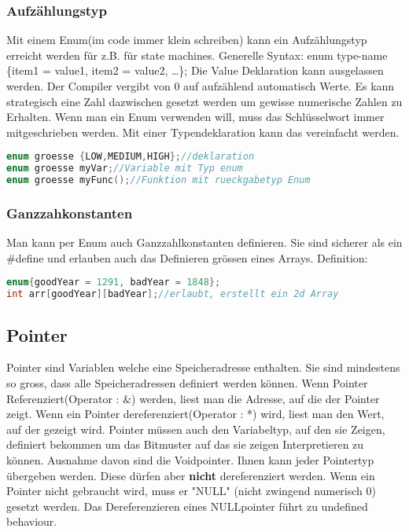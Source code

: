 \subsubsection{Aufzählungstyp}

Mit einem Enum(im code immer klein schreiben) kann ein Aufzählungstyp erreicht werden für z.B. für state machines. Generelle Syntax:\newline
enum type-name \{item1 = value1, item2 = value2, …\};\newline
Die Value Deklaration kann ausgelassen werden. Der Compiler vergibt von 0 auf aufzählend automatisch Werte. Es kann strategisch eine Zahl dazwischen gesetzt werden um gewisse numerische Zahlen zu Erhalten.\newline
Wenn man ein Enum verwenden will, muss das Schlüsselwort  immer mitgeschrieben werden. Mit einer Typendeklaration kann das vereinfacht werden. 

\begin{lstlisting}[language = c]
enum groesse {LOW,MEDIUM,HIGH};//deklaration
enum groesse myVar;//Variable mit Typ enum
enum groesse myFunc();//Funktion mit rueckgabetyp Enum
\end{lstlisting}

\subsubsection{Ganzzahkonstanten}

Man kann per Enum auch Ganzzahlkonstanten definieren. Sie sind sicherer als ein \#define und erlauben auch das Definieren grössen eines Arrays. Definition:

\begin{lstlisting}[language = c]
enum{goodYear = 1291, badYear = 1848};
int arr[goodYear][badYear];//erlaubt, erstellt ein 2d Array
\end{lstlisting}

\subsection{Pointer}

Pointer sind Variablen welche eine Speicheradresse enthalten. Sie sind mindestens so gross, dass alle Speicheradressen definiert werden können.\newline
Wenn Pointer Referenziert(Operator : \&) werden, liest man die Adresse, auf die der Pointer zeigt.\newline
Wenn ein Pointer dereferenziert(Operator : *) wird, liest man den Wert, auf der gezeigt wird.\newline 
Pointer müssen auch den Variabeltyp, auf den sie Zeigen, definiert bekommen um das Bitmuster auf das sie zeigen Interpretieren zu können. Ausnahme davon sind die Voidpointer. Ihnen kann jeder Pointertyp übergeben werden. Diese dürfen aber \textbf{nicht} dereferenziert werden.\newline
Wenn ein Pointer nicht gebraucht wird, muss er "NULL" (nicht zwingend numerisch 0) gesetzt werden. Das Dereferenzieren eines NULLpointer  führt zu undefined behaviour.\newline

